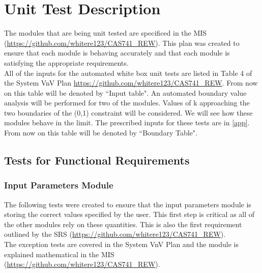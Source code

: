 \documentclass[12pt, titlepage]{article}
\begin{document}
\section{Unit Test Description} \label{testDescription} 

The modules that are being unit tested are specificed in the MIS 
(\url{https://github.com/whitere123/CAS741_REW}). This plan was created to 
ensure that each module is behaving accurately and that each module is 
satisfying the appropriate requirements.  \\

All of the inputs for the automated white box unit tests are listed in Table 4 
of the System VnV Plan \url{https://github.com/whitere123/CAS741_REW}. From now 
on this table will be denoted by ``Input table". An automated boundary value 
analysis will be performed for two of the modules. Values of k approaching the 
two boundaries of the (0,1) constraint will be considered. We will see how 
these modules behave in the limit. The prescribed inputs for these tests are in 
\ref{app}. From now on this table will be denoted by ``Boundary Table". 

\subsection{Tests for Functional Requirements}


\subsubsection{Input Parameters Module}

The following tests were created to ensure that the input parameters module is 
storing the correct values specified by the user. This first step is critical 
as all of the other modules rely on these quantities. This is also the first 
requirement outlined by the SRS 
(\url{https://github.com/whitere123/CAS741_REW}). \\
The exception tests are covered in the System 
VnV Plan and the module is explained mathematical in the 
MIS (\url{https://github.com/whitere123/CAS741_REW}). \\
\end{document}
